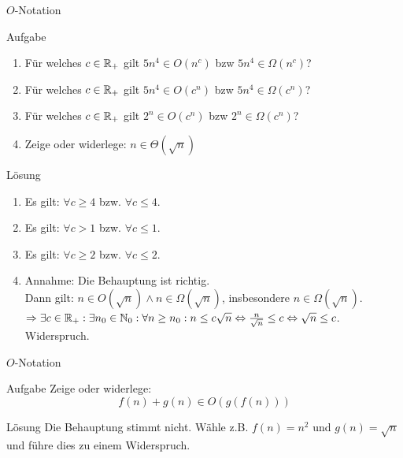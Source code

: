 \begin{frame}{$O$-Notation}
	\begin{exampleblock}{Aufgabe}
		\begin{enumerate}
			\item Für welches $c \in \mathbb{R}_+$ gilt $5n^4 \in O(n^c)$ bzw $5n^4 \in \Omega(n^c)$?
			\item Für welches $c \in \mathbb{R}_+$ gilt $5n^4 \in O(c^n)$ bzw $5n^4 \in \Omega(c^n)$?
			\item Für welches $c \in \mathbb{R}_+$ gilt $2^n \in O(c^n)$ bzw $2^n \in \Omega(c^n)$?
			\item Zeige oder widerlege: $n \in \Theta(\sqrt{n})$
		\end{enumerate}
	\end{exampleblock}
\pause
	\begin{block}{Lösung}
		\begin{enumerate}
			\item Es gilt: $\forall c \geq 4$ bzw. $\forall c \leq 4$.
			\item Es gilt: $\forall c > 1$ bzw. $\forall c \leq 1$.
			\item Es gilt: $\forall c \geq 2$ bzw. $\forall c \leq 2$.
			\item \small Annahme: Die Behauptung ist richtig.\\
				Dann gilt: $n \in O(\sqrt{n}) \wedge n \in \Omega(\sqrt{n})$, insbesondere $n \in \Omega(\sqrt{n})$.\\
				$\Rightarrow \exists c\in \mathbb{R}_+:\exists n_0\in\mathbb{N}_0: \forall n\geq n_0: n \leq c \sqrt{n} \Leftrightarrow \frac{n}{\sqrt{n}} \leq c \Leftrightarrow \sqrt{n} \leq c$. Widerspruch.
				
		\end{enumerate}
	\end{block}
\end{frame}

\begin{frame}{$O$-Notation}
    \begin{exampleblock}{Aufgabe}
    	Zeige oder widerlege:
    	\[
    		f(n) + g(n) \in O(g(f(n)))
    	\]
    \end{exampleblock}
\pause
	\begin{block}{Lösung}
		Die Behauptung stimmt nicht. Wähle z.B. $f(n) = n^2$ und $g(n) = \sqrt{n}$ und führe dies zu einem Widerspruch.
	\end{block}
\end{frame}

